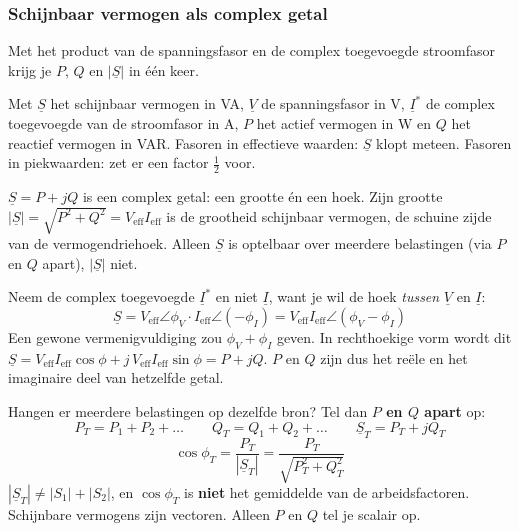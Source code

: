 \documentclass[a4paper,11pt]{article}
\begin{document}
\subsubsection{Schijnbaar vermogen als complex getal}

Met het product van de spanningsfasor en de complex toegevoegde stroomfasor krijg je $P$, $Q$ en
$|\underline{S}|$ in \'e\'en keer.

{Met $\underline{S}$ het schijnbaar vermogen in VA, $\underline{V}$ de spanningsfasor in V,
    $\underline{I}^{*}$ de complex toegevoegde van de stroomfasor in A, $P$ het actief vermogen in W
    en $Q$ het reactief vermogen in VAR. Fasoren in effectieve waarden: $\underline{S}$ klopt meteen.
    Fasoren in piekwaarden: zet er een factor $\tfrac12$ voor.}

\begin{waarschuwing}
    $\underline{S} = P + jQ$ is een complex getal: een grootte \'en een hoek. Zijn grootte
    $|\underline{S}| = \sqrt{P^2 + Q^2} = V_{\text{eff}} I_{\text{eff}}$ is de grootheid schijnbaar
    vermogen, de schuine zijde van de vermogendriehoek. Alleen $\underline{S}$ is optelbaar over meerdere
    belastingen (via $P$ en $Q$ apart), $|\underline{S}|$ niet.
\end{waarschuwing}

Neem de complex toegevoegde $\underline{I}^{*}$ en niet $\underline{I}$, want je wil de hoek
\emph{tussen} $\underline{V}$ en $\underline{I}$:
\[\underline{S} = V_{\text{eff}}\angle\phi_V \cdot I_{\text{eff}}\angle(-\phi_I)
    = V_{\text{eff}} I_{\text{eff}}\angle(\phi_V - \phi_I)\]
Een gewone vermenigvuldiging zou $\phi_V + \phi_I$ geven. In rechthoekige vorm wordt dit
$\underline{S} = V_{\text{eff}} I_{\text{eff}}\cos\phi + j\,V_{\text{eff}} I_{\text{eff}}\sin\phi = P + jQ$.
$P$ en $Q$ zijn dus het re\"ele en het imaginaire deel van hetzelfde getal.

\begin{examenbox}
    Hangen er meerdere belastingen op dezelfde bron? Tel dan \textbf{$P$ en $Q$ apart} op:
    \[P_T = P_1 + P_2 + \dots \qquad Q_T = Q_1 + Q_2 + \dots \qquad \underline{S}_T = P_T + jQ_T\]
    \[\cos\phi_T = \frac{P_T}{|\underline{S}_T|} = \frac{P_T}{\sqrt{P_T^2 + Q_T^2}}\]
     $|\underline{S}_T| \neq |S_1| + |S_2|$, en
    $\cos\phi_T$ is \textbf{niet} het gemiddelde van de arbeidsfactoren. Schijnbare vermogens
    zijn vectoren. Alleen $P$ en $Q$ tel je scalair op.
\end{examenbox}
\end{document}
